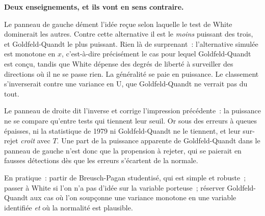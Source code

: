 \documentclass[10pt]{beamer}
\begin{document}
\begin{notes}

  \textbf{Deux enseignements, et ils vont en sens contraire.}

  \bigskip

  Le panneau de gauche dément l'idée reçue selon laquelle le test de White
  dominerait les autres. Contre cette alternative il est le \emph{moins}
  puissant des trois, et Goldfeld-Quandt le plus puissant. Rien là de
  surprenant~: l'alternative simulée est monotone en $x$, c'est-à-dire
  précisément le cas pour lequel Goldfeld-Quandt est conçu, tandis que White
  dépense des degrés de liberté à surveiller des directions où il ne se passe
  rien. La généralité se paie en puissance. Le classement s'inverserait contre
  une variance en U, que Goldfeld-Quandt ne verrait pas du tout.

  \bigskip

  Le panneau de droite dit l'inverse et corrige l'impression précédente~: la
  puissance ne se compare qu'entre tests qui tiennent leur seuil. Or sous des
  erreurs à queues épaisses, ni la statistique de 1979 ni Goldfeld-Quandt ne le
  tiennent, et leur sur-rejet \emph{croît} avec $T$. Une part de la puissance
  apparente de Goldfeld-Quandt dans le panneau de gauche n'est donc que la
  propension à rejeter, qui se paierait en fausses détections dès que les
  erreurs s'écartent de la normale.

  \bigskip

  En pratique~: partir de Breusch-Pagan studentisé, qui est simple et robuste~;
  passer à White si l'on n'a pas d'idée sur la variable porteuse~; réserver
  Goldfeld-Quandt aux cas où l'on soupçonne une variance monotone en une
  variable identifiée \emph{et} où la normalité est plausible.

\end{notes}
\end{document}
